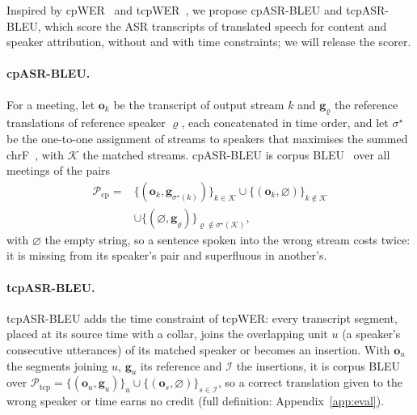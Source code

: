 Inspired by cpWER~\citep{watanabe2020chime6} and tcpWER~\citep{neumann2023meeteval}, we propose cpASR-BLEU and tcpASR-BLEU,
which score the ASR transcripts of translated speech for content and speaker attribution, without and with time
constraints; we will release the scorer.

\paragraph{cpASR-BLEU.} For a meeting, let $\bm{o}_k$ be the transcript of output stream $k$ and $\bm{g}_\varrho$ the
reference translations of reference speaker $\varrho$, each concatenated in time order, and let $\sigma^\star$ be the
one-to-one assignment of streams to speakers that maximises the summed chrF~\citep{popovic2015chrf}, with $\mathcal{K}$
the matched streams. cpASR-BLEU is corpus BLEU~\citep{post2018call} over all meetings of the pairs
\begin{equation}
\begin{aligned}
\mathcal{P}_{\mathrm{cp}}={}&\{(\bm{o}_k,\bm{g}_{\sigma^\star(k)})\}_{k\in\mathcal{K}}\cup\{(\bm{o}_k,\varnothing)\}_{k\notin\mathcal{K}}\\
&\cup\{(\varnothing,\bm{g}_\varrho)\}_{\varrho\notin\sigma^\star(\mathcal{K})},
\end{aligned}
\label{eq:cpbleu}
\end{equation}
with $\varnothing$ the empty string, so a sentence spoken into the wrong stream costs twice: it is missing from its
speaker's pair and superfluous in another's.

\paragraph{tcpASR-BLEU.} tcpASR-BLEU adds the time constraint of tcpWER: every transcript segment, placed at its source
time with a collar, joins the overlapping unit $u$ (a speaker's consecutive utterances) of its matched speaker or
becomes an insertion. With $\bm{o}_u$ the segments joining $u$, $\bm{g}_u$ its reference and $\mathcal{I}$ the
insertions, it is corpus BLEU over $\mathcal{P}_{\mathrm{tcp}}=\{(\bm{o}_u,\bm{g}_u)\}_u\cup\{(\bm{o}_s,\varnothing)\}_{s\in\mathcal{I}}$,
so a correct translation given to the wrong speaker or time earns no credit (full definition: Appendix~\ref{app:eval}).

